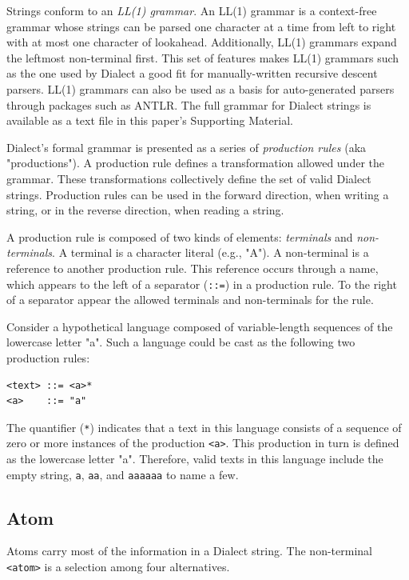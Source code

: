 \documentclass{article}
\def\ttt{\texttt}
\begin{document}
Strings conform to an \textit{LL(1) grammar}. An LL(1) grammar is a context-free grammar whose strings can be parsed one character at a time from left to right with at most one character of lookahead. Additionally, LL(1) grammars expand the leftmost non-terminal first. This set of features makes LL(1) grammars such as the one used by Dialect a good fit for manually-written recursive descent parsers. LL(1) grammars can also be used as a basis for auto-generated parsers through packages such as ANTLR.\cite{parr2014} The full grammar for Dialect strings is available as a text file in this paper's Supporting Material.

Dialect's formal grammar is presented as a series of \textit{production rules} (aka "productions"). A production rule defines a transformation allowed under the grammar. These transformations collectively define the set of valid Dialect strings. Production rules can be used in the forward direction, when writing a string, or in the reverse direction, when reading a string. 

A production rule is composed of two kinds of elements: \textit{terminals} and \textit{non-terminals}. A terminal is a character literal (e.g., "A"). A non-terminal is a reference to another production rule. This reference occurs through a name, which appears to the left of a separator (\ttt{::=}) in a production rule. To the right of a separator appear the allowed terminals and non-terminals for the rule.

Consider a hypothetical language composed of variable-length sequences of the lowercase letter "a". Such a language could be cast as the following two production rules:

\begin{lstlisting}
<text> ::= <a>*
<a>    ::= "a"
\end{lstlisting}

The quantifier (\ttt{*}) indicates that a text in this language consists of a sequence of zero or more instances of the production \ttt{<a>}. This production in turn is defined as the lowercase letter "a". Therefore, valid texts in this language include the empty string, \ttt{a}, \ttt{aa}, and \ttt{aaaaaa} to name a few.

\subsection*{Atom}

Atoms carry most of the information in a Dialect string. The non-terminal \ttt{<atom>} is a selection among four alternatives.
\end{document}
